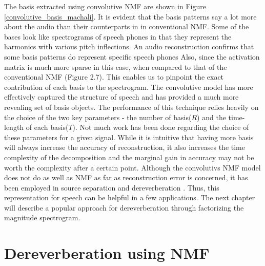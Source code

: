 \documentclass[12pt, a4paper, oneside]{book}
\begin{document}
The basis extracted using convolutive NMF are shown in Figure \ref{convolutive_basis_machali}. It is evident that the basis patterns say a lot more about the audio than their counterparts in in conventional NMF. Some of the bases look like spectrograms of speech phones in that they represent the harmonics with various pitch inflections. An audio reconstruction confirms that some basis patterns do represent specific speech phones\cite{A} Also, since the activation matrix is much more sparse in this case, when compared to that of the conventional NMF (Figure 2.7). This enables us to pinpoint the exact contribution of each basis to the spectrogram.
The convolutive model has more effectively captured the structure of speech and has provided a much more revealing set of basis objects. The performance of this technique relies heavily on the choice of the two key parameters - the number of basis($R$) and the time-length of each basis($T$). Not much work has been done regarding the choice of these parameters for a given signal. 
While it is intuitive that having more basis will always increase the accuracy of reconstruction, it also increases the time complexity of the decomposition and the marginal gain in accuracy may not be worth the complexity after a certain point.
Although the convolutivs NMF model does not do as well as NMF as far as reconstruction error is concerned, it has been employed in source separation \cite{paris} and dereverberation \cite{baby}. Thus, this representation for speech can be helpful in a few applications.
The next chapter will describe a popular approach for dereverberation through factorizing the magnitude spectrogram. 





\chapter{Dereverberation using NMF}
\end{document}
